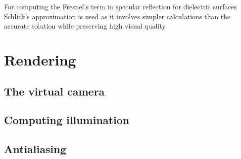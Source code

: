 For computing the Fresnel's term in specular reflection for dielectric surfaces Schlick's approximation \parencite{schlick94} is used as it involves simpler calculations than the accurate solution while preserving high visual quality.

\section{Rendering}

\subsection{The virtual camera}

\subsection{Computing illumination}

\subsection{Antialiasing}



